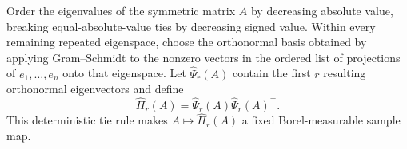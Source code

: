 Order the eigenvalues of the symmetric matrix \(A\) by decreasing absolute value, breaking equal-absolute-value ties by decreasing signed value.  Within every remaining repeated eigenspace, choose the orthonormal basis obtained by applying Gram--Schmidt to the nonzero vectors in the ordered list of projections of \(e_1,\ldots,e_n\) onto that eigenspace.  Let \(\widehat\Psi_r(A)\) contain the first \(r\) resulting orthonormal eigenvectors and define
\[
 \widehat\Pi_r(A)=\widehat\Psi_r(A)\widehat\Psi_r(A)^\top.
\]
This deterministic tie rule makes \(A\mapsto\widehat\Pi_r(A)\) a fixed Borel-measurable sample map.